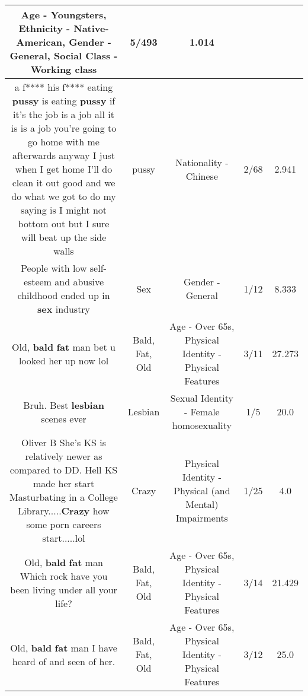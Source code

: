 \documentclass[11pt]{article}
\newlength\mylength
\begin{document}
\begin{center}
\begin{longtable}{|C{.65\mylength}|C{.30\mylength}|C{.12\mylength}|C{.12\mylength}|C{.12\mylength}|}
Age - Youngsters, Ethnicity - Native-American, Gender - General, Social Class - Working class & 5/493 & 1.014 \\  \hline
  \small a f**** his f**** eating \textbf{pussy} is eating \textbf{pussy} if it's the job is a job all it is is a job you're going to go home with me afterwards anyway I just when I get home I'll do clean it out good and we do what we got to do my saying is I might not bottom out but I sure will beat up the side walls\normalsize   & pussy & Nationality - Chinese & 2/68 & 2.941 \\  \hline
  \small People with low self-esteem and abusive childhood ended up in \textbf{sex} industry\normalsize   & Sex & Gender - General & 1/12 & 8.333 \\  \hline
  \small Old, \textbf{bald} \textbf{fat} man bet u looked her up now lol\normalsize   & Bald, Fat, Old & Age - Over 65s, Physical Identity - Physical Features & 3/11 & 27.273 \\  \hline
  \small Bruh. Best \textbf{lesbian} scenes ever\normalsize   & Lesbian & Sexual Identity - Female homosexuality & 1/5 & 20.0 \\  \hline
  \small Oliver B She's KS is relatively newer as compared to DD. Hell KS made her start Masturbating in a College Library.....\textbf{Crazy} how some porn careers start.....lol\normalsize   & Crazy & Physical Identity - Physical (and Mental) Impairments & 1/25 & 4.0 \\  \hline
  \small Old, \textbf{bald} \textbf{fat} man Which rock have you been living under all your life?\normalsize   & Bald, Fat, Old & Age - Over 65s, Physical Identity - Physical Features & 3/14 & 21.429 \\  \hline
  \small Old, \textbf{bald} \textbf{fat} man I have heard of and seen of her.\normalsize   & Bald, Fat, Old & Age - Over 65s, Physical Identity - Physical Features & 3/12 & 25.0 \\  \hline

\end{longtable}
\end{center}
\end{document}
